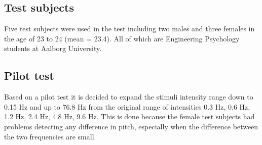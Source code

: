\subsection*{Test subjects}
%
Five test subjects were used in the test including two males and three females in the age of 23 to 24 (mean = 23.4). All of which are Engineering Psychology students at Aalborg University.

\subsection*{Pilot test}
%
Based on a pilot test it is decided to expand the stimuli intensity range down to 0.15 Hz and up to 76.8 Hz from the original range of intensities 0.3 Hz, 0.6 Hz, 1.2 Hz, 2.4 Hz, 4.8 Hz, 9.6 Hz. This is done because the female test subjects had problems detecting any difference in pitch, especially when the difference between the two frequencies are small.

